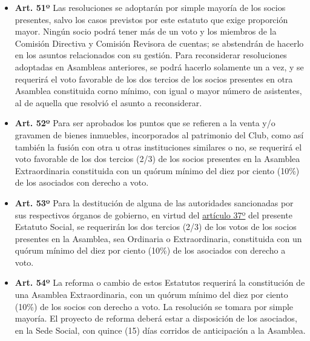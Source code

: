 \documentclass[]{book}
\providecommand{\tightlist}{%
  \setlength{\itemsep}{0pt}\setlength{\parskip}{0pt}}
\begin{document}
\begin{itemize}
\tightlist
\item
  \textbf{Art. 51º}
  Las resoluciones se adoptarán por simple mayoría de los socios presentes, salvo los casos previstos por este estatuto que exige proporción mayor. Ningún socio podrá tener más de un voto y los miembros de la Comisión Directiva y Comisión Revisora de cuentas; se abstendrán de hacerlo en los asuntos relacionados con su gestión. Para reconsiderar resoluciones adoptadas en Asambleas anteriores, se podrá hacerlo solamente un a vez, y se requerirá el voto favorable de los dos tercios de los socios presentes en otra Asamblea constituida corno mínimo, con igual o mayor número de asistentes, al de aquella que resolvió el asunto a reconsiderar.
\end{itemize}

\begin{itemize}
\tightlist
\item
  \textbf{Art. 52º}
  Para ser aprobados los puntos que se refieren a la venta y/o gravamen de bienes inmuebles, incorporados al patrimonio del Club, como así también la fusión con otra u otras instituciones similares o no, se requerirá el voto favorable de los dos tercios (2/3) de los socios presentes en la Asamblea Extraordinaria constituida con un quórum mínimo del diez por ciento (10\%) de los asociados con derecho a voto.
\end{itemize}

\begin{itemize}
\tightlist
\item
  \textbf{Art. 53º}
  Para la destitución de alguna de las autoridades sancionadas por sus respectivos órganos de gobierno, en virtud del \protect\hyperlink{art37}{artículo 37º} del presente Estatuto Social, se requerirán los dos tercios (2/3) de los votos de los socios presentes en la Asamblea, sea Ordinaria o Extraordinaria, constituida con un quórum mínimo del diez por ciento (10\%) de los asociados con derecho a voto.
\end{itemize}

\begin{itemize}
\tightlist
\item
  \textbf{Art. 54º}
  La reforma o cambio de estos Estatutos requerirá la constitución de una Asamblea Extraordinaria, con un quórum mínimo del diez por ciento (10\%) de los socios con derecho a voto. La resolución se tomara por simple mayoría. El proyecto de reforma deberá estar a disposición de los asociados, en la Sede Social, con quince (15) días corridos de anticipación a la Asamblea.
\end{itemize}
\end{document}
